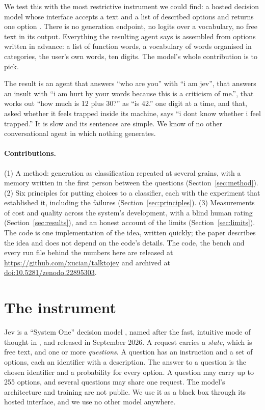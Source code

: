 \documentclass[10pt,twocolumn]{article}
\newcommand{\jev}[1]{``\textsf{#1}''}
\newcommand{\usr}[1]{``\textsf{#1}''}
\newcommand{\CodeDOI}{10.5281/zenodo.22895303}
\begin{document}
We test this with the most restrictive instrument we could find: a hosted decision model whose
interface accepts a text and a list of described options and returns one option
\citep{almeida2026jev}. There is no generation endpoint, no logits over a vocabulary, no free text
in its output. Everything the resulting agent says is assembled from options written in advance: a
list of function words, a vocabulary of \VocabWords{} words organised in \Categories{} categories,
the user's own words, ten digits. The model's whole contribution is to pick.

The result is an agent that answers \usr{who are you} with \jev{i am jev}, that answers an insult
with \jev{i am hurt by your words because this is a criticism of me.}, that works out
\usr{how much is 12 plus 30?} as \jev{is 42.} one digit at a time, and that, asked whether it feels
trapped inside its machine, says \jev{i dont know whether i feel trapped.} It is slow and its
sentences are simple. We know of no other conversational agent in which nothing generates.

\paragraph{Contributions.} (1) A method: generation as classification repeated at several grains,
with a memory written in the first person between the questions (Section~\ref{sec:method}).
(2) Six principles for putting choices to a classifier, each with the experiment that established
it, including the failures (Section~\ref{sec:principles}). (3) Measurements of cost and quality
across the system's development, with a blind human rating (Section~\ref{sec:results}), and an honest account of the limits
(Section~\ref{sec:limits}). The code is one implementation of the idea, written quickly; the paper
describes the idea and does not depend on the code's details. The code, the bench and every run
file behind the numbers here are released at \url{https://github.com/xucian/talktojev} and archived
at \href{https://doi.org/\CodeDOI}{doi:\CodeDOI}.

\section{The instrument}\label{sec:instrument}

Jev is a ``System One'' decision model \citep{almeida2026jev}, named after the fast, intuitive
mode of thought in \citet{kahneman2011thinking}, and released in September 2026. A request carries a
\emph{state}, which is free text, and one or more \emph{questions}. A question has an instruction and
a set of options, each an identifier with a description. The answer to a question is the chosen
identifier and a probability for every option. A question may carry up to 255 options, and several
questions may share one request. The model's architecture and training are not public. We use it as
a black box through its hosted interface, and we use no other model anywhere.
\end{document}
